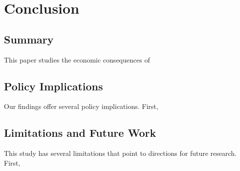 \chapter{Conclusion}\label{conclusion}

\section{Summary}\label{section:summary}

This paper studies the economic consequences of 

\section{Policy Implications}\label{section:policy_implications}

Our findings offer several policy implications. First, 

\section{Limitations and Future Work}\label{section:limitations}

This study has several limitations that point to directions for future research. First, 